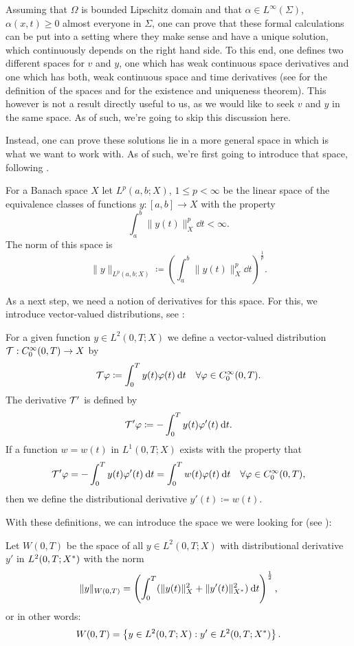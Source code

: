 \documentclass[../thesis.tex]{subfiles}
\begin{document}
Assuming that $\Omega$ is bounded Lipschitz domain and that $\alpha \in L^\infty(\Sigma)$, $\alpha (x, t) \geq 0$ almost everyone in $\Sigma$, one can prove that these formal calculations can be put into a setting where they make sense and have a unique solution, which continuously depends on the right hand side.
To this end, one defines two different spaces for $v$ and $y$, one which has weak continuous space derivatives and one which has both, weak continuous space and time derivatives (see \cite[p.\ 111]{Troeltzsch} for the definition of the spaces and \cite[Satz 3.9, p.\ 112]{Troeltzsch} for the existence and uniqueness theorem).
This however is not a result directly useful to us, as we would like to seek $v$ and $y$ in the same space. As of such, we're going to skip this discussion here.

Instead, one can prove these solutions lie in a more general space in which is what we want to work with. As of such, we're first going to introduce that space, following \cite[3.4.1 Abstrakte Funktionen, p.\ 113ff.]{Troeltzsch}.
\begin{definition}
For a Banach space $X$ let $L^p(a, b; X)$, $1 \leq p < \infty$ be the linear space of the equivalence classes of functions $y : [a, b] \to X$ with the property
\[
	\int_a^b \| y(t) \|_X^p \dd t < \infty.
\]
The norm of this space is
\[
	\| y \|_{L^p(a, b; X)} \coloneqq \left( \int_a^b \| y(t) \|_X^p \dd t \right)^{\frac{1}{p}}.
\]
\end{definition}
As a next step, we need a notion of derivatives for this space. For this, we introduce vector-valued distributions, see \cite[p.\ 117]{Troeltzsch}:
\begin{definition}
For a given function $y \in L^2(0, T; X)$ we define a vector-valued distribution $\mathcal{T} : C_0^\infty(0, T) \to X$ by
\[
	\mathcal{T} \varphi \coloneqq \int_0^T y(t) \varphi(t) \:\mathrm{d} t \quad \forall \varphi \in C_0^\infty(0, T).
\] 
The derivative $\mathcal{T}'$ is defined by
\[
	\mathcal{T}' \varphi \coloneqq - \int_0^T y(t) \varphi'(t) \:\mathrm{d} t.
\]
If a function $w = w(t)$ in $L^1(0, T; X)$ exists with the property that
\[
	\mathcal{T}' \varphi = - \int_0^T y(t) \varphi'(t) \:\mathrm{d} t = \int_0^T w(t) \varphi(t) \:\mathrm{d} t \quad \forall \varphi \in C_0^\infty(0, T),
\]
then we define the distributional derivative $y'(t) \coloneqq w(t)$.
\end{definition}
With these definitions, we can introduce the space we were looking for (see \cite[p.\ 118]{Troeltzsch}):
\begin{definition}
Let $W(0, T)$ be the space of all $y \in L^2(0, T; X)$ with distributional derivative $y'$ in $L^2(0, T; X^*)$ with the norm
\[
	\| y \|_{W(0, T)} = \left( \int_0^T ( \| y(t) \|_X^2 + \| y'(t) \|_{X^*}^2 ) \:\mathrm{d} t \right)^{\frac{1}{2}},
\]
or in other words:
\[
	W(0, T) = \left\{ y \in L^2(0, T; X) \mathrel{}:\mathrel{} y' \in L^2(0, T; X^*) \right\}.
\]
\end{definition}
\end{document}
